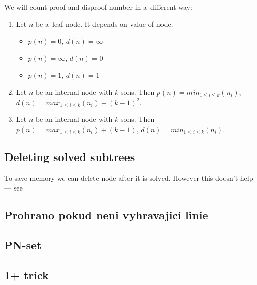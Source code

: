 We will count proof and disproof number in a~different way:
\begin{enumerate} 
	\item Let $n$ be a~leaf node. It depends on value of node.
		\begin{itemize}
			\item \value{true} $p(n)=0$, $d(n)=\infty$
			\item \value{false} $p(n)=\infty$, $d(n)=0$
			\item \value{unknown} $p(n)=1$, $d(n)=1$
		\end{itemize}
	\item Let $n$ be an internal  node with $k$ sons. Then \newline
		$p(n) = min_{1 \le i \le k}(n_i)$, \newline
		$d(n) = max_{1 \le i \le k}(n_i) + (k-1)^2$. 
	\item Let $n$ be an internal  node with $k$ sons. Then \newline
		$p(n) = max_{1 \le i \le k}(n_i) + (k-1)$, \newline 
		$d(n) = min_{1 \le i \le k}(n_i)$.
\end{enumerate}
		
\subsection{Deleting solved subtrees} \label{delete}

To save memory we can delete node after it is solved. However this doesn't 
help --- see 

\subsection{ Prohrano pokud neni vyhravajici linie}

\subsection{PN-set}

\subsection{1+ trick}



